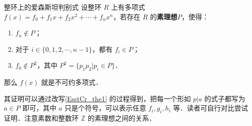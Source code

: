 \begin{theorem}{整环上的爱森斯坦判别式}
设整环 $R$ 上有多项式 $f(x)=f_0+f_1x+f_2x^2+\cdots+f_nx^n$，若存在 $R$ 的\textbf{素理想}$P$，使得：
\begin{enumerate}
\item $f_n\not\in P$；
\item 对于 $i\in\{0, 1, 2, \cdots, n-1\}$，都有 $f_i\in P$；
\item $f_0\not\in P^2$，其中 $P^2=\{p_1p_2|p_i\in P\}$．
\end{enumerate}
那么 $f(x)$ 就是不可约多项式．
\end{theorem}

其证明可以通过改写\autoref{EsstCr_the1} 的过程得到，把每一个形如 $p|a$ 的式子都写为 $a\in P$ 即可，其中 $a$ 只是个符号，可以表示任意 $f_i, g_i, h_i$ 等．读者可自行对比尝试证明．注意素数和整数环 $\mathbb{Z}$ 的素理想之间的关系．





